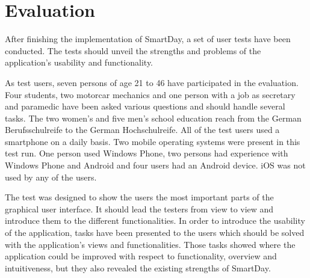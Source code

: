\chapter{Evaluation}
\label{cha:evaluation}
After finishing the implementation of SmartDay, a set of user tests have been conducted. The tests should unveil the strengths and problems of the application's usability and functionality.

As  test users, seven persons of age 21 to 46 have participated in the evaluation. Four students, two motorcar mechanics and one person with a job as secretary and paramedic have been asked various questions and should handle several tasks. The two women's and five men's school education reach from the German Berufsschulreife to the German Hochschulreife. All of the test users used a smartphone on a daily basis. Two mobile operating systems were present in this test run. One person used Windows Phone, two persons had experience with Windows Phone and Android and four users had an Android device. iOS was not used by any of the users.

The  test was designed to show the users the most important parts of the graphical user interface. It should lead the testers from view to view and introduce them to the different functionalities. In order to introduce the usability of the application, tasks have been presented to the users which should be solved with the application's views and functionalities. Those tasks showed where the application could be improved with respect to functionality, overview and intuitiveness, but they also revealed the existing strengths of SmartDay.

